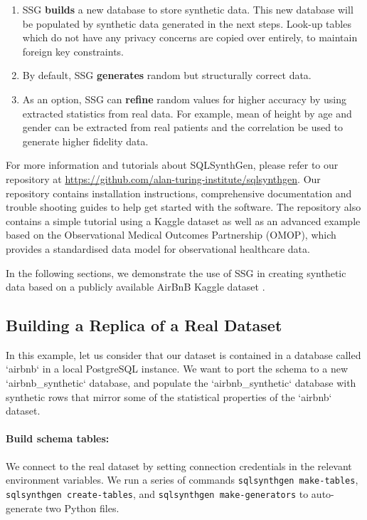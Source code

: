 \documentclass[11pt]{article}
\begin{document}
\begin{enumerate}
    \item SSG \textbf{builds} a new database to store synthetic data. This new database will be populated by synthetic data generated in the next steps. Look-up tables which do not have any privacy concerns are copied over entirely, to maintain foreign key constraints.
    \item By default, SSG \textbf{generates} random but structurally correct data. 
    \item As an option, SSG can \textbf{refine} random values for higher accuracy by using extracted statistics from real data. For example, mean of height by age and gender can be extracted from real patients and the correlation be used to generate higher fidelity data.
\end{enumerate}

For more information and tutorials about SQLSynthGen, please refer to our repository at \url{https://github.com/alan-turing-institute/sqlsynthgen}. Our repository \cite{repository} contains installation instructions, comprehensive documentation and trouble shooting guides to help get started with the software. The repository also contains a simple tutorial using a Kaggle dataset \cite{airbnb} as well as an advanced example based on the Observational Medical Outcomes Partnership (OMOP)\cite{omop}, which provides a standardised data model for observational healthcare data. 

In the following sections, we demonstrate the use of SSG in creating synthetic data based on a publicly available AirBnB Kaggle dataset \cite{airbnb}.

\subsection{Building a Replica of a Real Dataset}

In this example, let us consider that our dataset is contained in a database called `airbnb` in a local PostgreSQL instance. We want to port the schema to a new `airbnb\_synthetic` database, and populate the `airbnb\_synthetic` database with synthetic rows that mirror some of the statistical properties of the `airbnb` dataset.

\paragraph{Build schema tables:}
We connect to the real dataset by setting connection credentials in the relevant environment variables. We run a series of commands \texttt{sqlsynthgen make-tables}, \texttt{sqlsynthgen create-tables}, and \texttt{sqlsynthgen make-generators} to auto-generate two Python files. 
\end{document}
